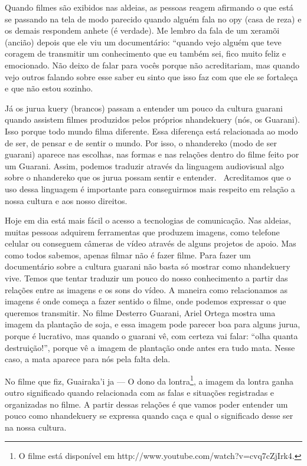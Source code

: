 {{Quando filmes são exibidos nas aldeias, as pessoas reagem afirmando o
que está se passando na tela de modo parecido quando alguém fala no opy
(casa de reza) e os demais respondem anhete (é verdade). Me lembro da
fala de um xeramõi (ancião) depois que ele viu um documentário: ``quando
vejo alguém que teve coragem de transmitir um conhecimento que eu
também sei, fico muito feliz e emocionado. Não deixo de falar para
vocês porque não acreditariam, mas quando vejo outros falando sobre
esse saber eu sinto que isso faz com que ele se fortaleça e que não
estou sozinho.

Já os jurua kuery (brancos) passam a entender um pouco da cultura
guarani quando assistem filmes produzidos pelos próprios nhandekuery
(nós, os Guarani). Isso porque todo mundo filma diferente. Essa
diferença está relacionada ao modo de ser, de pensar e de sentir o
mundo. Por isso, o nhandereko (modo de ser guarani) aparece nas
escolhas, nas formas e nas relações dentro do filme feito por um
Guarani. Assim, podemos traduzir através da linguagem audiovisual algo
sobre o nhandereko que os jurua possam sentir e entender.~ Acreditamos
que o uso dessa linguagem é importante para conseguirmos mais respeito
em relação a nossa cultura e aos nosso direitos.

Hoje em dia está mais fácil o acesso a tecnologias de comunicação. Nas
aldeias, muitas pessoas adquirem ferramentas que produzem imagens, como
telefone celular ou conseguem câmeras de vídeo através de alguns
projetos de apoio. Mas como todos sabemos, apenas filmar não é fazer
filme. Para fazer um documentário sobre a cultura guarani não basta só
mostrar como nhandekuery vive. Temos que tentar traduzir um pouco do
nosso conhecimento a partir das relações entre as imagens e os sons do
vídeo. A maneira como relacionamos as imagens é onde começa a fazer
sentido o filme, onde podemos expressar o que queremos transmitir. No
filme Desterro Guarani, Ariel Ortega mostra uma imagem da plantação de
soja, e essa imagem pode parecer boa para alguns jurua, porque é
lucrativo, mas quando o guarani vê, com certeza vai falar: ``olha quanta
destruição!'', porque vê a imagem de plantação onde antes era tudo mata.
Nesse caso, a mata aparece para nós pela falta dela. 

No filme que fiz, Guairaka’i ja --- O dono da lontra\footnote{O filme está
disponível em http://www.youtube.com/watch?v=cvq7cZjIrk4.},
a imagem da lontra ganha outro significado quando relacionada com as
falas e situações registradas e organizadas no filme. A partir dessas
relações é que vamos poder entender um pouco como nhandekuery se
expressa quando caça e qual o significado desse ser na nossa cultura. 

}}
